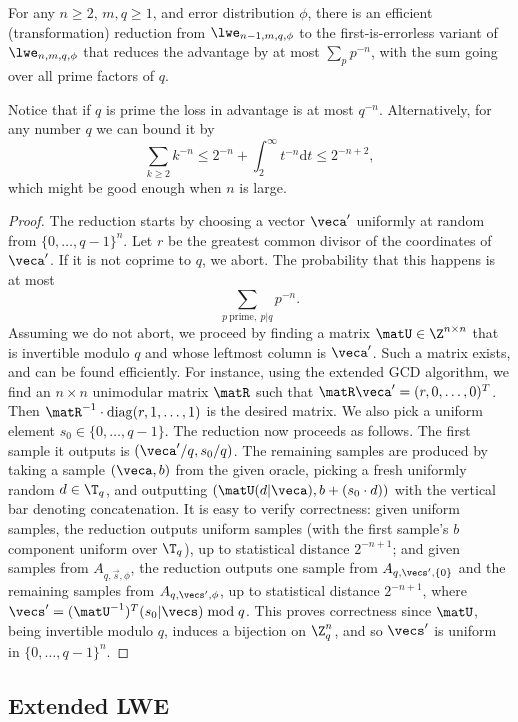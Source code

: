 \begin{lemma}\label{lem:firsterrorlesshard}
For any $n \ge 2$, $m, q \ge 1$, and error distribution $\phi$,
there is an efficient (transformation) reduction from $\lwe_{n-1,m,q,\phi}$ to the first-is-errorless variant of $\lwe_{n,m,q,\phi}$
that reduces the advantage by at most $\sum_p p^{-n}$, with the sum going over all prime factors of $q$.
\end{lemma}
Notice that if $q$ is prime the loss in advantage is at most $q^{-n}$. Alternatively, for any number $q$ we can bound it by
\[
\sum_{k \ge 2} k^{-n} \le 2^{-n} + \int_{2}^\infty t^{-n} \mathrm{d} t \le 2^{-n+2},
\]
which might be good enough when $n$ is large.
\begin{proof}
The reduction starts by choosing a
  vector $\veca'$ uniformly at random from
  $\{0,\ldots,q-1\}^n$. Let $r$ be the greatest common divisor of the coordinates of $\veca'$. 
	If it is not coprime to $q$, we abort. The probability that this
  happens is at most 
\[
 \sum_{p~\text{prime}, \ p|q} p^{-n}.
\]
Assuming we do not abort, we proceed by finding a matrix $\matU \in \Z^{n \times n}$ that is invertible modulo $q$ and
whose leftmost column is $\veca'$.
Such a matrix exists, and can be found efficiently. For instance, using the extended GCD algorithm, we find an $n\times n$ unimodular matrix
$\matR$ such that $\matR \veca' = (r,0,\ldots,0)^T$. Then $\matR^{-1} \cdot \mathrm{diag}(r,1,\ldots,1)$ is the desired matrix.
We also pick a uniform element $s_0 \in \{0,\ldots,q-1\}$. The reduction now proceeds as follows. The first sample it outputs is
$(\veca'/q, s_0/q)$. The remaining samples are produced by taking a sample $(\veca,b)$ from the given oracle, picking
a fresh uniformly random $d \in \T_q$, and outputting $(\matU(d|\veca),b+(s_0 \cdot d))$ with the vertical bar denoting concatenation.
It is easy to verify correctness: given uniform samples, the reduction outputs uniform samples
(with the first sample's $b$ component uniform over $\T_q$), up to statistical distance $2^{-n+1}$;
and given samples from $A_{q,\vec{s},\phi}$, the reduction outputs one sample from $A_{q,\vecs',\{0\}}$
and the remaining samples from $A_{q,\vecs',\phi}$, up to statistical distance $2^{-n+1}$,
where $\vecs' = (\matU^{-1})^T (s_0|\vecs) \bmod q$.
This proves correctness since $\matU$, being invertible modulo $q$, induces a bijection on $\Z_q^n$, and so $\vecs'$ is uniform in $\{0,\ldots,q-1\}^n$.
\end{proof}

\subsection{Extended LWE}
\label{sec:extlwe}

